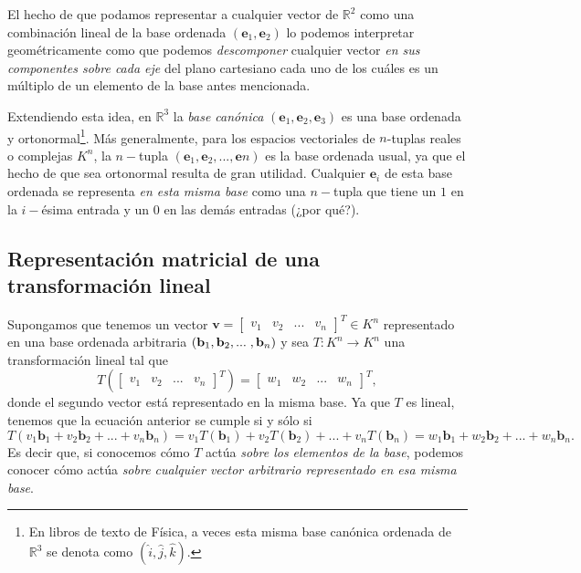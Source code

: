 \documentclass[12pt]{article}
\begin{document}
El hecho de que podamos representar a cualquier vector de $\mathbb{R}^2$ como una combinación lineal de la base ordenada $(\mathbf{e}_1,\mathbf{e}_2)$ lo podemos interpretar geométricamente como que podemos \emph{descomponer} cualquier vector \emph{en sus componentes sobre cada eje} del plano cartesiano \textemdash cada uno de los cuáles es un múltiplo de un elemento de la base antes mencionada.

Extendiendo esta idea, en $\mathbb{R}^3$ la \emph{base canónica} $(\mathbf{e}_1,\mathbf{e}_2,\mathbf{e}_3)$ es una base ordenada y ortonormal\footnote{En libros de texto de Física, a veces esta misma base canónica ordenada de $\mathbb{R}^3$ se denota como $(\hat{i},\hat{j},\hat{k}).$}. Más generalmente, para los espacios vectoriales de $n$-tuplas reales o complejas $K^n$, la $n-$tupla $(\mathbf{e}_1,\mathbf{e}_2,...,\mathbf{e}n)$ es la base ordenada usual, ya que el hecho de que sea ortonormal resulta de gran utilidad. Cualquier $\mathbf{e}_i$ de esta base ordenada se representa \emph{en esta misma base} como una $n-$tupla que tiene un $1$ en la $i-$ésima entrada y un $0$ en las demás entradas (¿por qué?).  

\subsection{Representación matricial de una transformación lineal}

Supongamos que tenemos un vector $\mathbf{v}=\begin{bmatrix} v_1&v_2&...&v_n \end{bmatrix}^T\in K^n$ representado en una base ordenada arbitraria $(\mathbf{b}_1,\mathbf{b}_2,...\hspace{1mm} ,\mathbf{b}_n)$ y sea $T:K^n\to K^n$ una transformación lineal tal que $$T(\begin{bmatrix} v_1&v_2&...&v_n \end{bmatrix}^T) = \begin{bmatrix} w_1&w_2&...&w_n \end{bmatrix}^T,$$ donde el segundo vector está representado en la misma base. Ya que $T$ es lineal, tenemos que la ecuación anterior se cumple si y sólo si \[ T(v_1\mathbf{b}_1+v_2\mathbf{b}_2+...+v_n\mathbf{b}_n)= v_1T(\mathbf{b}_1)+v_2T(\mathbf{b}_2)+...+v_nT(\mathbf{b}_n)=w_1\mathbf{b}_1 + w_2\mathbf{b}_2+...+w_n\mathbf{b}_n.\] Es decir que, si conocemos cómo $T$ actúa \emph{sobre los elementos de la base}, podemos conocer cómo actúa \emph{sobre cualquier vector arbitrario representado en esa misma base}.
\vspace{3mm}
\end{document}
